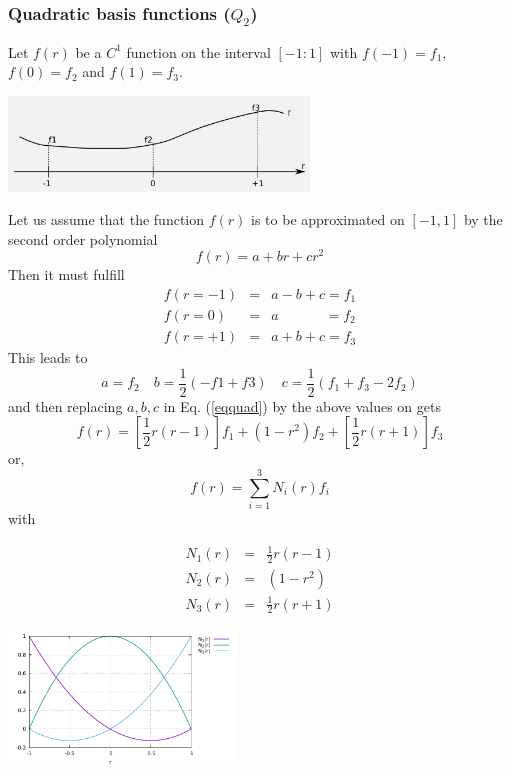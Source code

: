 \subsubsection{Quadratic basis functions ($Q_2$) \label{sec:bf2}}

Let $f(r)$ be a $C^1$ function on the interval $[-1:1]$ with $f(-1)=f_1$, $f(0)=f_2$ and $f(1)=f_3$.
\begin{center}
\includegraphics[width=8cm]{images/quadshapefct.png}
\end{center}

Let us assume that the function $f(r)$ is to be approximated on $[-1,1]$ by the second order polynomial
\begin{equation}
f(r)=a+br+cr^2 \label{eqquad}
\end{equation}
Then it must fulfill
\begin{eqnarray}
f(r=-1)&=&a-b+c = f_1 \nonumber\\
f(r=0) &=&a\quad\quad\quad\;     = f_2 \nonumber\\
f(r=+1)&=&a+b+c = f_3 \nonumber
\end{eqnarray}
This leads to
\[
a=f_2 
\quad
b=\frac{1}{2}(-f1+f3)
\quad
c=\frac{1}{2}(f_1+f_3-2f_2)
\]
and then replacing $a,b,c$ in Eq. (\ref{eqquad}) by the above values on gets
\[
f(r)=\left[\frac{1}{2}r(r-1)\right] f_1 + (1-r^2) f_2 + \left[\frac{1}{2}r(r+1)\right] f_3
\]
or,
\[
f(r) = \sum_{i=1}^3 N_i(r) f_i
\]
with
\begin{mdframed}[backgroundcolor=blue!5]
\begin{eqnarray}
N_1(r) &=& \frac{1}{2}r(r-1) \nonumber\\
N_2(r) &=& (1-r^2) \nonumber\\ 
N_3(r) &=& \frac{1}{2}r(r+1) 
\end{eqnarray}
\end{mdframed}

\begin{center}
\includegraphics[width=6cm]{images/basis1D/quadratic.pdf}
\end{center}


